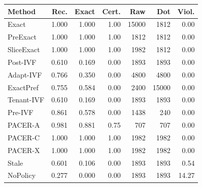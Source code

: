 \begin{tabular}{lrrrrrr}
\toprule
Method & Rec. & Exact & Cert. & Raw & Dot & Viol.\\
\midrule
Exact & 1.000 & 1.000 & 1.00 & 15000 & 1812 & 0.00\\
PreExact & 1.000 & 1.000 & 1.00 & 1812 & 1812 & 0.00\\
SliceExact & 1.000 & 1.000 & 1.00 & 1982 & 1812 & 0.00\\
\midrule
Post-IVF & 0.610 & 0.169 & 0.00 & 1893 & 1893 & 0.00\\
Adapt-IVF & 0.766 & 0.350 & 0.00 & 4800 & 4800 & 0.00\\
ExactPref & 0.755 & 0.584 & 0.00 & 2400 & 15000 & 0.00\\
Tenant-IVF & 0.610 & 0.169 & 0.00 & 1893 & 1893 & 0.00\\
Pre-IVF & 0.861 & 0.578 & 0.00 & 1438 & 240 & 0.00\\
\midrule
PACER-A & 0.981 & 0.881 & 0.75 & 707 & 707 & 0.00\\
PACER-C & 1.000 & 1.000 & 1.00 & 1982 & 1982 & 0.00\\
PACER-X & 1.000 & 1.000 & 1.00 & 1982 & 1982 & 0.00\\
\midrule
Stale & 0.601 & 0.106 & 0.00 & 1893 & 1893 & 0.54\\
NoPolicy & 0.277 & 0.000 & 0.00 & 1893 & 1893 & 14.27\\
\bottomrule
\end{tabular}
